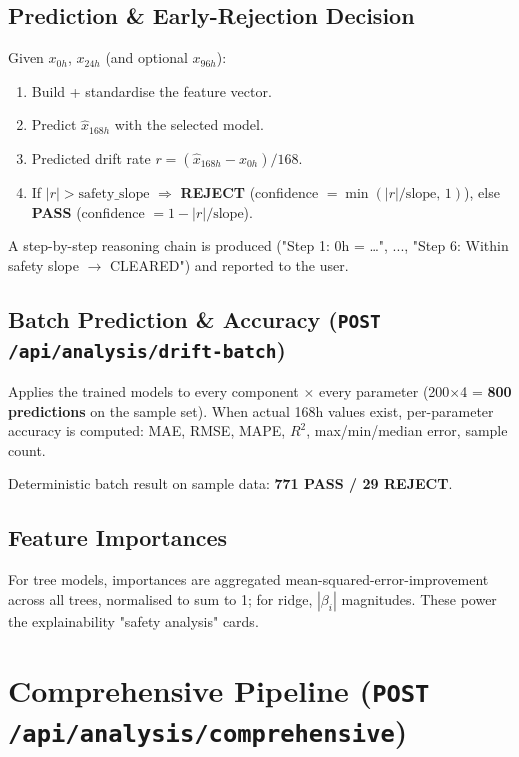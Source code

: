 \documentclass[11pt,a4paper]{article}
\newcommand{\code}[1]{\texttt{\small #1}}
\begin{document}
\subsection{Prediction \& Early-Rejection Decision}
Given $x_{0h}$, $x_{24h}$ (and optional $x_{96h}$):
\begin{enumerate}[leftmargin=1.5em]
  \item Build + standardise the feature vector.
  \item Predict $\hat{x}_{168h}$ with the selected model.
  \item Predicted drift rate $r = (\hat{x}_{168h} - x_{0h})/168$.
  \item If $|r| > \text{safety\_slope}$ $\Rightarrow$ \textbf{REJECT}
        (confidence $= \min(|r|/\text{slope},\,1)$), else \textbf{PASS}
        (confidence $= 1-|r|/\text{slope}$).
\end{enumerate}

A step-by-step reasoning chain is produced ("Step 1: 0h = \ldots", ..., "Step 6: Within safety
slope $\rightarrow$ CLEARED") and reported to the user.

\subsection{Batch Prediction \& Accuracy (\code{POST /api/analysis/drift-batch})}
Applies the trained models to every component $\times$ every parameter (200$\times$4 =
\textbf{800 predictions} on the sample set). When actual 168h values exist, per-parameter
accuracy is computed: MAE, RMSE, MAPE, $R^2$, max/min/median error, sample count.

Deterministic batch result on sample data: \textbf{771 PASS / 29 REJECT}.

\subsection{Feature Importances}
For tree models, importances are aggregated mean-squared-error-improvement across all trees,
normalised to sum to 1; for ridge, $|\beta_i|$ magnitudes. These power the explainability
"safety analysis" cards.

\section{Comprehensive Pipeline (\code{POST /api/analysis/comprehensive})}
\label{sec:comprehensive}
\end{document}
